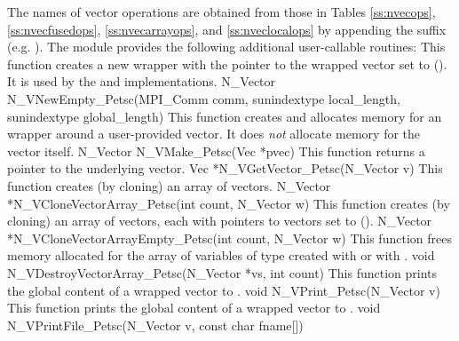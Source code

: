 The names of vector operations are obtained from those in 
Tables \ref{ss:nvecops}, \ref{ss:nvecfusedops}, \ref{ss:nvecarrayops}, and
\ref{ss:nveclocalops} by appending the
suffix  (e.g. ).
The module {\nvecpetsc}  provides the following additional user-callable routines:
{ 
  This function creates a new {\nvector} wrapper with the pointer to
  the wrapped {\petsc} vector set to (). It is used by the 
   and  implementations. 
}
{
  N\_Vector N\_VNewEmpty\_Petsc(MPI\_Comm comm, sunindextype local\_length, 
  sunindextype global\_length)
}
{  
  This function creates and allocates memory for an {\nvecpetsc}
  wrapper around a user-provided {\petsc} vector. It does {\em not} 
  allocate memory for the vector  itself.
}
{
  N\_Vector N\_VMake\_Petsc(Vec *pvec)
}
{  
  This function returns a pointer to the underlying {\petsc} vector.
}
{
  Vec *N\_VGetVector\_Petsc(N\_Vector v)
}
{ 
  This function creates (by cloning) an array of  {\nvecpetsc} vectors.
}
{
  N\_Vector *N\_VCloneVectorArray\_Petsc(int count, N\_Vector w)
}
{ 
  This function creates (by cloning) an array of  {\nvecpetsc} vectors,
  each with pointers to {\petsc} vectors set to ().
}
{
  N\_Vector *N\_VCloneVectorArrayEmpty\_Petsc(int count, N\_Vector w)
}
{
  This function frees memory allocated for the array of  variables of
  type  created with  or with
  .
}
{
  void N\_VDestroyVectorArray\_Petsc(N\_Vector *vs, int count)
}
{
  This function prints the global content of a wrapped {\petsc} vector to .
}
{
  void N\_VPrint\_Petsc(N\_Vector v)
}
{  
  This function prints the global content of a wrapped {\petsc} vector to .
}
{
  void N\_VPrintFile\_Petsc(N\_Vector v, const char fname[])
}

